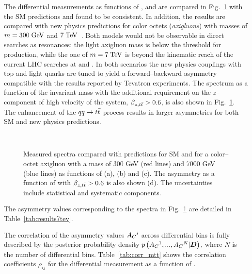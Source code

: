 The \ac{} differential measurements as functions of
\mtt{}, \pttt{} and \ytt{} are compared in Fig.~\ref{fig:unfac_diff}
with the SM predictions and found to be consistent. 
In addition, the results are compared with new physics predictions for
color octets ({\it axigluons}) with masses of $m=300 \; \mathrm{GeV}{}$ and $7
\; \mathrm{TeV}{}$~\cite{AguilarSaavedra:2011ci}. Both models would not
be observable in direct searches as \ttbar{} resonances: the light
axigluon mass is below the threshold for \ttbar{} production, while
the one of $m=7 \; \mathrm{TeV}$ is beyond the kinematic reach of the current LHC
searches at \seventev{} and \eighttev{}. In both scenarios the new
physics couplings with top and light quarks are tuned to yield a
forward--backward asymmetry compatible with the results reported by
Tevatron experiments.
The \ac{} spectrum as a function of the \ttbar{} invariant mass \mtt{}
with the additional requirement on the $z$--component of high velocity
of the \ttbar{} system, $\beta_{z,t\bar{t}}{}>0.6$, is also shown in
Fig.~\ref{fig:unfac_diff}. The enhancement of the $q\bar{q}{}\to t\bar{t}{}$
process results in larger asymmetries for both SM and new physics
predictions.
\begin{figure}[!htb]\centering
   \quad
   \\
   \quad
  \caption{Measured \ac{} spectra compared with predictions for SM and
    for a color--octet axigluon with a mass of 300 GeV (red lines) and
    7000 GeV (blue lines) 
    as functions of \mtt{} (a), \pttt{} (b) and \ytt{} (c). The
    asymmetry as a function of \mtt{} with $\beta_{z,t\bar{t}}{}>0.6$ is also
    shown (d). The uncertainties include statistical and systematic
    components.}
  \label{fig:unfac_diff}
\end{figure}
The asymmetry values corresponding to the spectra in
Fig.~\ref{fig:unfac_diff} are detailed in
Table~\ref{tab:results7tev}.

The correlation of the asymmetry values $A_C{}^i$ across differential
bins is fully described by the posterior probability density
$p\left(A_C{}^1,...,A_C{}^N|\boldsymbol{D}{}\right)$, where $N$ is the
number of differential bins. Table~\ref{tab:corr_mtt} shows the
correlation coefficients $\rho_{ij}$ for the differential \ac{}
measurement as a function of \mtt{}.
